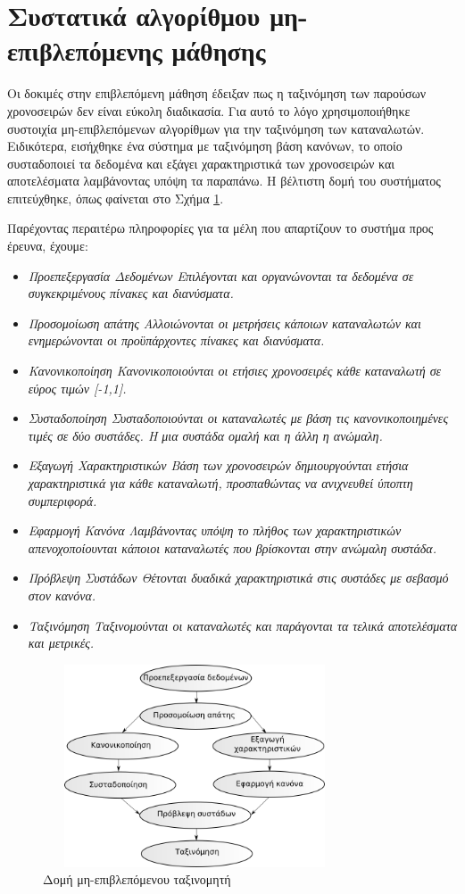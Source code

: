 \section{Συστατικά αλγορίθμου μη-επιβλεπόμενης μάθησης}
Οι δοκιμές στην επιβλεπόμενη μάθηση έδειξαν πως η ταξινόμηση των παρούσων χρονοσειρών δεν είναι εύκολη διαδικασία. Για αυτό το λόγο χρησιμοποιήθηκε συστοιχία μη-επιβλεπόμενων αλγορίθμων για την ταξινόμηση των καταναλωτών. Ειδικότερα, εισήχθηκε ένα σύστημα με ταξινόμηση βάση κανόνων, το οποίο συσταδοποιεί τα δεδομένα και εξάγει χαρακτηριστικά των χρονοσειρών και αποτελέσματα λαμβάνοντας υπόψη τα παραπάνω. Η βέλτιστη δομή του συστήματος επιτεύχθηκε, όπως φαίνεται στο Σχήμα \ref{fig:unsupervisedsystem}.\par
Παρέχοντας περαιτέρω πληροφορίες για τα μέλη που απαρτίζουν το συστήμα προς έρευνα, έχουμε:
\begin{itemize}
\item \em{Προεπεξεργασία Δεδομένων} Επιλέγονται και οργανώνονται τα δεδομένα σε συγκεκριμένους πίνακες και διανύσματα.
\item \em{Προσομοίωση απάτης} Αλλοιώνονται οι μετρήσεις κάποιων καταναλωτών και ενημερώνονται οι προϋπάρχοντες πίνακες και διανύσματα.
\item \em{Κανονικοποίηση} Κανονικοποιούνται οι ετήσιες χρονοσειρές κάθε καταναλωτή σε εύρος τιμών [-1,1].
\item \em{Συσταδοποίηση} Συσταδοποιούνται οι καταναλωτές με βάση τις κανονικοποιημένες τιμές σε δύο συστάδες. Η μια συστάδα ομαλή και η άλλη η ανώμαλη. 
\item \em{Εξαγωγή Χαρακτηριστικών} Βάση των χρονοσειρών δημιουργούνται ετήσια χαρακτηριστικά για κάθε καταναλωτή, προσπαθώντας να ανιχνευθεί ύποπτη συμπεριφορά.
\item \em{Εφαρμογή Κανόνα} Λαμβάνοντας υπόψη το πλήθος των χαρακτηριστικών απενοχοποίουνται κάποιοι καταναλωτές που βρίσκονται στην ανώμαλη συστάδα.
\item \em{Πρόβλεψη Συστάδων} Θέτονται δυαδικά χαρακτηριστικά στις συστάδες με σεβασμό στον κανόνα.
\item \em{Ταξινόμηση} Ταξινομούνται οι καταναλωτές και παράγονται τα τελικά αποτελέσματα και μετρικές.
\end{itemize}
\begin{figure}
\centering
 \includegraphics[width=90mm, height=60mm]{../../plots/systems/un_supervised.png}
 \caption{Δομή μη-επιβλεπόμενου ταξινομητή}
\label{fig:unsupervisedsystem}
 \end{figure}
 
